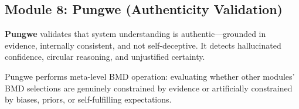 \subsection{Module 8: Pungwe (Authenticity Validation)}

\begin{definition}
\textbf{Pungwe} validates that system understanding is authentic—grounded in evidence, internally consistent, and not self-deceptive. It detects hallucinated confidence, circular reasoning, and unjustified certainty.
\end{definition}

\begin{theorem}
Pungwe performs meta-level BMD operation: evaluating whether other modules' BMD selections are genuinely constrained by evidence or artificially constrained by biases, priors, or self-fulfilling expectations.
\end{theorem}

